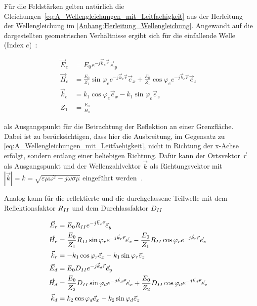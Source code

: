 Für die Feldstärken gelten natürlich die Gleichungen~\eqref{eq:A_Wellengleichungen_mit_Leitfaehigkeit} aus der Herleitung der Wellengleichung im \Anhang \ref{Anhang:Herleitung_Wellengleichung}. Angewandt auf die dargestellten geometrischen Verhältnisse ergibt sich für die einfallende Welle (Index \glqq$e$\grqq)~\cite{EM_Schirmung}:

\begin{align}
    \vec E_e &= E_0 e^{-j\vec k_e \vec r} \vec e_y \\
    \vec H_e &= \frac{E_0}{Z_1} \sin{\varphi_e} e^{-j \vec k_e \vec r} \vec e_x + \frac{E_0}{Z_1} \cos{\varphi_e} e^{-j \vec k_e \vec r} \vec e_z \\
    \vec k_e &= k_1 \cos{\varphi_e} \vec e_x - k_1 \sin{\varphi_e} \vec e_z \\
    Z_1 &= \frac{E_0}{H_0}
\end{align}

als Ausgangspunkt für die Betrachtung der Reflektion an einer Grenzfläche. Dabei ist zu berücksichtigen, dass hier die Ausbreitung, im Gegensatz zu \Gleichungen \eqref{eq:A_Wellengleichungen_mit_Leitfaehigkeit}, nicht in Richtung der x-Achse erfolgt, sondern entlang einer beliebigen Richtung. Dafür kann der Ortsvektor $\vec r$ als Ausgangspunkt und der Wellenzahlvektor $\vec k$ als Richtungsvektor mit
$|\vec k| = k = \sqrt{\varepsilon \mu \omega^2 - j \omega \sigma \mu} $ eingeführt werden~\cite{EM_Schirmung}. \par \vspace{\linespace} Analog kann für die reflektierte und die durchgelassene Teilwelle mit dem Reflektionsfaktor $R_{\uproman{2}}$ und dem Durchlassfaktor $D_{\uproman{2}}$

\begin{align}
    \vec E_r &= E_0 R_{\uproman{2}} e^{-j\vec k_r \vec r} \vec e_y \\
    \vec H_r &= \frac{E_0}{Z_1} R_{\uproman{2}} \sin{\varphi_r} e^{-j \vec k_r \vec r} \vec e_x - \frac{E_0}{Z_1} R_{\uproman{2}} \cos{\varphi_r} e^{-j \vec k_r \vec r} \vec e_z \\
    \vec k_r &= - k_1 \cos{\varphi_r} \vec e_x - k_1 \sin{\varphi_r} \vec e_z \\
    \vec E_d &= E_0 D_{\uproman{2}} e^{-j\vec k_d \vec r} \vec e_y \\
    \vec H_d &= \frac{E_0}{Z_2} D_{\uproman{2}} \sin{\varphi_d} e^{-j \vec k_d \vec r} \vec e_x + \frac{E_0}{Z_2} D_{\uproman{2}} \cos{\varphi_d} e^{-j \vec k_d \vec r} \vec e_z \\
    \vec k_d &= k_2 \cos{\varphi_d} \vec e_x - k_2 \sin{\varphi_d} \vec e_z
\end{align}

